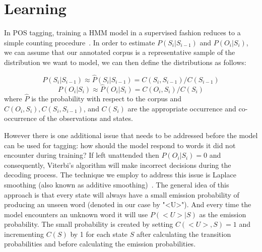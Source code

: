 \section{Learning}
\label{sec:learning}
In POS tagging, training a HMM model in a supervised fashion reduces to a simple counting procedure~\cite{nlpBook}. In order to estimate $P( S_i | S_{i-1} )$ and $P( O_i | S_i )$, we can assume that our annotated corpus is a representative sample of the distribution we want to model, we can then define the distributions as follows:

\vspace{-1em}
\begin{equation}
P( S_i | S_{i-1} ) \approx \hat{P}( S_i | S_{i-1} ) = C( S_i, S_{i-1} )/C( S_{i-1} )
\end{equation}
\vspace{-1em}
\begin{equation}
P( O_i | S_i ) \approx \hat{P}( O_i | S_i ) = C( O_i, S_i )/C( S_i )
\end{equation}
where $\hat{P}$ is the probability with respect to the corpus and $C( O_i, S_i ), C( S_i, S_{i-1} )$, and $C( S_i )$ are the appropriate occurrence and co-occurrence of the observations and states.

However there is one additional issue that needs to be addressed before the model can be used for tagging: how should the model respond to words it did not encounter during training? If left unattended then $P( O_i | S_i ) = 0$ and consequently, Viterbi's algorithm will make incorrect decisions during the decoding process. The technique we employ to address this issue is Laplace smoothing (also known as additive smoothing)~\cite{laplaceSmooth}. The general idea of this approach is that every state will always have a small emission probability of producing an unseen word (denoted in our case by "<U>"). And every time the model encounters an unknown word it will use $P( <U> | S )$ as the emission probability. The small probability is created by setting $C( <U>, S ) = 1$ and incrementing $C( S )$ by 1 for each state $S$ after calculating the transition probabilities and before calculating the emission probabilities.

